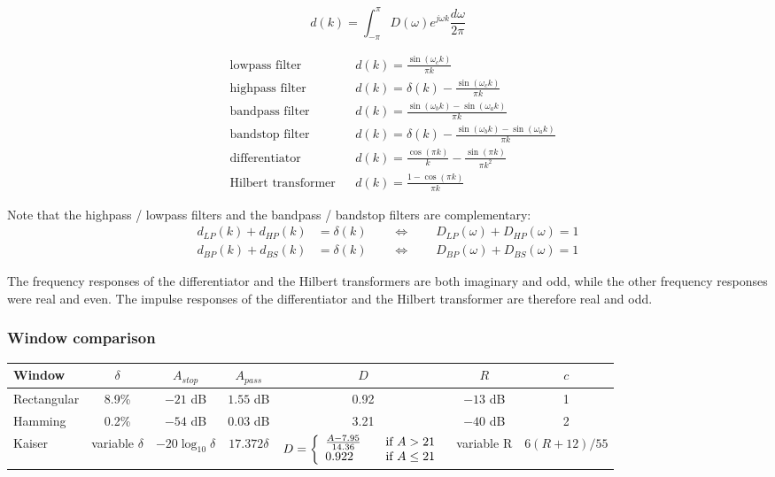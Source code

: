 \begin{equation}
d(k) = \int_{-\pi}^{\pi}D(\omega) e^{j\omega k}\frac{d\omega}{2\pi} \label{eq:impresp}
\end{equation}

\begin{align*}
&\text{lowpass filter} && d(k) = \frac{\sin(\omega_ck)}{\pi k} \\
&\text{highpass filter} && d(k) = \delta(k) - \frac{\sin(\omega_ck)}{\pi k} \\
&\text{bandpass filter} && d(k) = \frac{\sin(\omega_bk) - \sin(\omega_ak)}{\pi k} \\
&\text{bandstop filter} && d(k) = \delta(k) - \frac{\sin(\omega_bk) - \sin(\omega_ak)}{\pi k} \\
&\text{differentiator} && d(k) = \frac{\cos(\pi k)}{k}-\frac{\sin(\pi k)}{\pi k^2}\\
&\text{Hilbert transformer} && d(k) = \frac{1-\cos(\pi k)}{\pi k}
\end{align*}

Note that the highpass / lowpass filters and the bandpass / bandstop 
filters are complementary:
\begin{align*}
	d_{LP}(k) + d_{HP}(k) &= \delta(k) \qquad \Leftrightarrow \qquad D_{LP}(\omega) + D_{HP}(\omega) = 1 \\
	d_{BP}(k) + d_{BS}(k) &= \delta(k) \qquad \Leftrightarrow \qquad D_{BP}(\omega) + D_{BS}(\omega) = 1
\end{align*}

The frequency responses of the differentiator and the Hilbert transformers
are both imaginary and odd, while the other frequency responses were real
and even. The impulse responses of the differentiator and the Hilbert
transformer are therefore real and odd.

\subsubsection{Window comparison}
\begin{tabular}{|l|c|c|c|c|c|c|}
	\hline
	Window & $\delta$ & $A_{stop}$ & $A_{pass}$ & $D$ & $R$ & $c$ \\
	\hline
	Rectangular & 8.9\% & $-21$ dB & $1.55$ dB & 0.92 & $-13$ dB & 1\\
	Hamming & 0.2\% & $-54$ dB & $0.03$ dB & 3.21 & $-40$ dB & 2\\
	Kaiser & variable $\delta$ & $-20\log_{10}\delta$ & $17.372\delta$ & $D = \left\{
						\begin{array}{l l}
							\frac{A-7.95}{14.36}& \quad \text{if } A>21\\
							0.922 & \quad \text{if } A \leq 21
						\end{array} \right.$ & variable R & $6(R+12)/55$\\
	\hline
\end{tabular}

